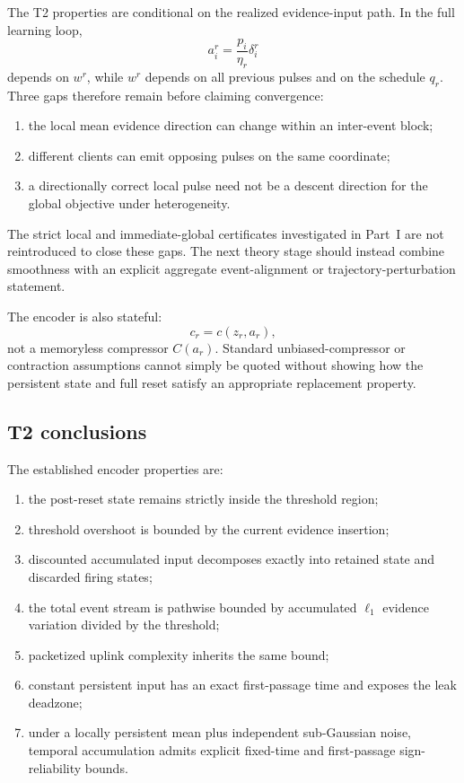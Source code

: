 The T2 properties are conditional on the realized evidence-input path. In the full learning loop,
\begin{equation}
    a_i^r
    =
    \frac{p_i}{\eta_r}\delta_i^r
\end{equation}
depends on $w^r$, while $w^r$ depends on all previous pulses and on the schedule $q_r$. Three gaps therefore remain before claiming convergence:
\begin{enumerate}
    \item the local mean evidence direction can change within an inter-event block;
    \item different clients can emit opposing pulses on the same coordinate;
    \item a directionally correct local pulse need not be a descent direction for the global objective under heterogeneity.
\end{enumerate}
The strict local and immediate-global certificates investigated in Part~I are not reintroduced to close these gaps. The next theory stage should instead combine smoothness with an explicit aggregate event-alignment or trajectory-perturbation statement.

The encoder is also stateful:
\begin{equation}
    c_r=c(z_r,a_r),
\end{equation}
not a memoryless compressor $C(a_r)$. Standard unbiased-compressor or contraction assumptions cannot simply be quoted without showing how the persistent state and full reset satisfy an appropriate replacement property.

\subsection{T2 conclusions}

The established encoder properties are:
\begin{enumerate}
    \item the post-reset state remains strictly inside the threshold region;
    \item threshold overshoot is bounded by the current evidence insertion;
    \item discounted accumulated input decomposes exactly into retained state and discarded firing states;
    \item the total event stream is pathwise bounded by accumulated $\ell_1$ evidence variation divided by the threshold;
    \item packetized uplink complexity inherits the same bound;
    \item constant persistent input has an exact first-passage time and exposes the leak deadzone;
    \item under a locally persistent mean plus independent sub-Gaussian noise, temporal accumulation admits explicit fixed-time and first-passage sign-reliability bounds.
\end{enumerate}

